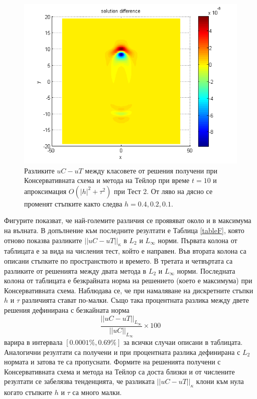 \documentclass{article}
\theoremstyle{remark}
\begin{document}
\begin{figure}[ht]
\begin{minipage}[b]{0.32\linewidth}
		\includegraphics[width=\linewidth]{../amitans/figures/compare_128_bt1_c09_h010.png}
	\end{minipage}
\caption{Разликите $uC - uT$  между класовете от решения получени при Консервативната схема и метода на Тейлор при време $t=10$ и апроксимация $O(|h|^2 + \tau^2)$ при Тест 2. От ляво на дясно се променят стъпките както следва $h=0.4, 0.2, 0.1$.}
\label{Test2_Diff}
\end{figure}
\FloatBarrier
Фигурите показват, че най-големите различия се проявяват около и в максимума на вълната. В допълнение към последните резултати е Таблица \ref{tableF}, която отново показва разликите $||uC - uT||_\kappa$ в  $L_2$ и ${L_\infty}$ норми. Първата колона от таблицата е за вида на числения тест, който е направен. Във втората колона са описани стъпките по пространството и времето. В третата и четвъртата са разликите от решенията между двата метода в $L_2$ и ${L_\infty}$ норми. Последната колона от таблицата е безкрайната норма на решението (което е максимума) при Консервативната схема. Наблюдава се, че при намаляване на дискретните стъпки $h$ и $\tau$ различията стават по-малки. Също така процентната разлика между двете решения дефинирана с безкайната норма
$$\frac{ ||uC - uT||_{L_\infty}} { ||uC||_{L_\infty} } \times 100$$
варира в интервала $[0.0001\%, 0.69\%]$ за всички случаи описани в таблицата. Аналогични резултати са получени и при процентната разлика дефинирана с $L_2$ нормата и затова те са пропуснати. Формите на решенията получени с Консервативната схема и метода на Тейлор са доста близки и от числените резултати се забелязва тенденцията, че разликата $||uC - uT||_\kappa$ клони към нула когато стъпките $h$ и $\tau$ са много малки.
\end{document}
